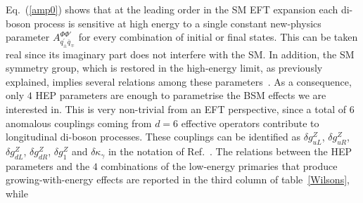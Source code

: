 Eq.~(\ref{amp0}) shows that at the leading order in the SM EFT expansion each di-boson process is sensitive at high energy to a single constant new-physics parameter $A^{\Phi\Phi'}_{q^\prime_{\pm}{\overline{q}}_{\mp}}$ for every combination of initial or final states. This can be taken real since its imaginary part does not interfere with the SM. In addition, the SM symmetry group, which is restored in the high-energy limit, as previously explained, implies  several relations among these parameters~\cite{Franceschini:2017ab}. %
As a consequence, only $4$ HEP parameters are enough to parametrise the BSM effects we are interested in. This is very non-trivial from an EFT perspective, since a total of $6$ anomalous couplings coming from $d=6$ effective operators contribute to longitudinal di-boson processes. These couplings can be identified as
${\delta g^Z_{uL}}$, ${\delta g^Z_{uR}}$, ${\delta g^Z_{dL}}$, ${\delta g^Z_{dR}}$, ${\delta g_1^Z}$ and ${\delta \kappa_{\gamma}}$ in the notation of Ref.~\cite{Gupta:2014rxa}.
The relations between the HEP parameters and the $4$ combinations of the low-energy primaries that produce growing-with-energy effects are reported in the third column of table~\ref{Wilsons}, while
